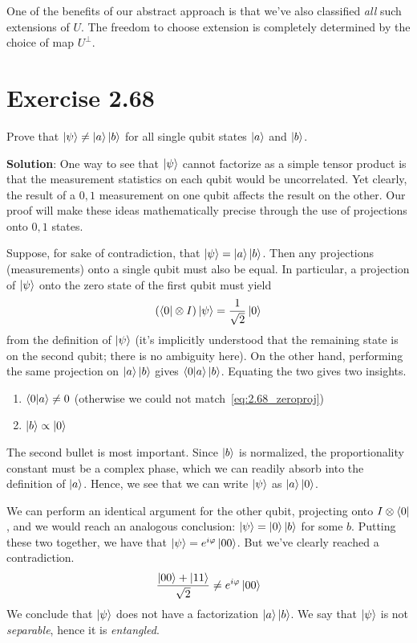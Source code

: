 \documentclass{book}
\begin{document}
    One of the benefits of our abstract approach is that we've also classified \emph{all} such extensions of $U$. The freedom to choose extension is completely determined by the choice of map $U^\perp$. 

\section*{Exercise 2.68}
    Prove that $\ket{\psi} \neq \ket{a}\ket{b}$ for all single qubit states $\ket{a}$ and $\ket{b}$.

    \textbf{Solution}: One way to see that $\ket{\psi}$ cannot factorize as a simple tensor product is that the measurement statistics on each qubit would be uncorrelated. Yet clearly, the result of a $0, 1$ measurement on one qubit affects the result on the other. Our proof will make these ideas mathematically precise through the use of projections onto $0, 1$ states. 

    Suppose, for sake of contradiction, that $\ket{\psi} = \ket{a}\ket{b}$. Then any projections (measurements) onto a single qubit must also be equal. In particular, a projection of $\ket{\psi}$ onto the zero state of the first qubit must yield
    \begin{align} \label{eq:2.68_zeroproj}
        (\bra{0}\otimes I) \ket{\psi} = \frac{1}{\sqrt{2}} \ket{0}
    \end{align}
    from the definition of $\ket{\psi}$ (it's implicitly understood that the remaining state is on the second qubit; there is no ambiguity here). On the other hand, performing the same projection on $\ket{a}\ket{b}$ gives $\braket{0}{a}\ket{b}$. Equating the two gives two insights.
    \begin{enumerate}
        \item $\bra{0}\ket{a} \neq 0$ (otherwise we could not match~\eqref{eq:2.68_zeroproj})
        \item $\ket{b} \propto \ket{0}$
    \end{enumerate}
    The second bullet is most important. Since $\ket{b}$ is normalized, the proportionality constant must be a complex phase, which we can readily absorb into the definition of $\ket{a}$. Hence, we see that we can write $\ket{\psi}$ as $\ket{a}\ket{0}$.

    We can perform an identical argument for the other qubit, projecting onto $I \otimes \bra{0}$, and we would reach an analogous conclusion: $\ket{\psi} = \ket{0}\ket{b}$ for some $b$. Putting these two together, we have that $\ket{\psi} = e^{i\varphi} \ket{00}$. But we've clearly reached a contradiction.
    \begin{align}
        \frac{\ket{00}+\ket{11}}{\sqrt{2}} \neq e^{i\varphi} \ket{00}
    \end{align}
    We conclude that $\ket{\psi}$ does not have a factorization $\ket{a}\ket{b}$. We say that $\ket{\psi}$ is not \emph{separable}, hence it is \emph{entangled}.
\end{document}
